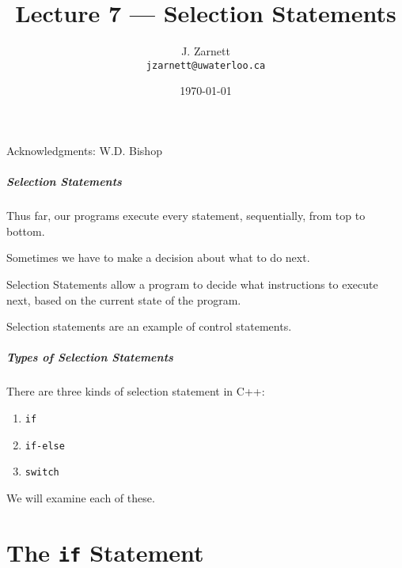 

\title{Lecture 7 --- Selection Statements}

\author{J. Zarnett\\
\texttt{jzarnett@uwaterloo.ca}}
\date{\today}



\begin{frame}
  \titlepage
  
  \begin{center}
  \small{Acknowledgments: W.D. Bishop}
  \end{center}
 \end{frame}
 
\begin{frame}
\frametitle{Selection Statements}
Thus far, our programs execute every statement, sequentially, from top to bottom.

Sometimes we have to make a decision about what to do next.

\alert{Selection Statements} allow a program to decide what instructions to execute next, based on the current state of the program.

Selection statements are an example of \alert{control statements}.

\end{frame}

\begin{frame}
\frametitle{Types of Selection Statements}

There are three kinds of selection statement in C++:

\begin{enumerate}
	\item \texttt{if}
	\item \texttt{if-else}
	\item \texttt{switch}
\end{enumerate}

We will examine each of these.

\end{frame}

\part{The \texttt{if} Statement}
\begin{frame}\partpage\end{frame}

